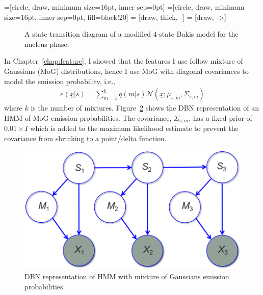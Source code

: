=[circle, draw, minimum size=16pt, inner sep=0pt]
=[circle, draw, minimum size=16pt, inner
sep=0pt, fill=black!20] 
 = [draw, thick, -]
 = [draw, ->]
\begin{figure}[!tbh]
\centering
  \caption{A state transition diagram of a modified 4-state Bakis model for the nucleus phase.}
  \label{fig:bakis}
\end{figure}

In Chapter~\ref{chap:feature}, I showed that the features I use follow mixture
of Gaussians (MoG) distributions, hence I use MoG with diagonal covariances to
model the emission probability, i.e.,
\begin{align}
e(\underline{x} | s) = \sum_{m=1}^k q(m | s)\mathcal{N}(\underline{x};
\mu_{s,m}, \Sigma_{s, m})
\end{align}
where $k$ is the number of mixtures.
Figure~\ref{fig:mog} shows the DBN representation of an HMM of MoG emission
probabilities. The covariance, $\Sigma_{s, m}$, has a fixed prior of $0.01\times
I$ which is added to the maximum likelihood estimate to prevent the covariance from shrinking to a point/delta function. 

\begin{figure}[tbh]
\centering
\includegraphics[width=0.5\columnwidth]{figures/mog.png}
\caption{DBN representation of HMM with mixture of
Gaussians emission probabilities.}
\label{fig:mog}
\end{figure}

